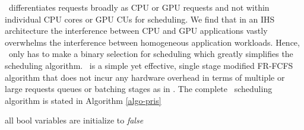 \par \prioname\ differentiates requests broadly as CPU or GPU requests and not within individual CPU cores or GPU CUs for scheduling. We find that in an IHS architecture the interference between CPU and GPU applications vastly overwhelms the interference between homogeneous application workloads. Hence, \prioname\ only has to make a binary selection for scheduling which greatly simplifies the scheduling algorithm. \prioname\ is a simple yet effective, single stage modified FR-FCFS algorithm that does not incur any hardware overhead in terms of multiple or large requests queues or batching stages as in \cite{sms}.
The complete \prioname\ scheduling algorithm is stated in Algorithm \ref{algo-pris}

\begin{algorithm}
	\small
	all bool variables are initialize to \textit{false}\\
	

\end{algorithm}
